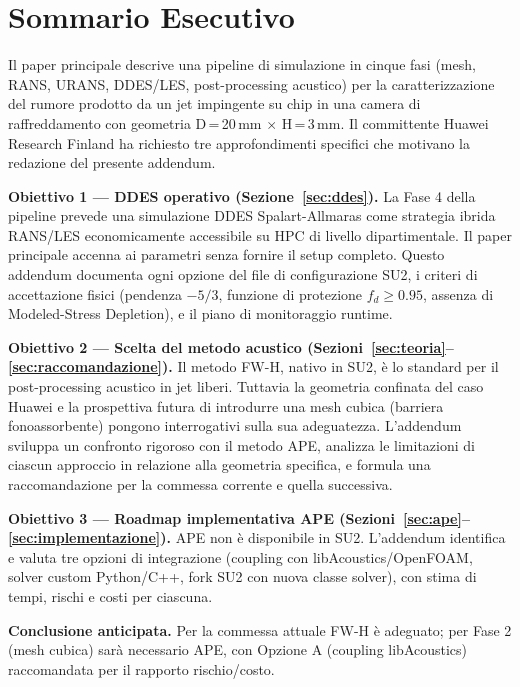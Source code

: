 \documentclass[11pt,a4paper]{article}
\begin{document}
\thispagestyle{fancy}
\section*{Sommario Esecutivo}

Il paper principale descrive una pipeline di simulazione in cinque fasi
(mesh, RANS, URANS, DDES/LES, post-processing acustico) per la caratterizzazione
del rumore prodotto da un jet impingente su chip in una camera di raffreddamento
con geometria D\,=\,20\,mm $\times$ H\,=\,3\,mm.
Il committente Huawei Research Finland ha richiesto tre approfondimenti specifici
che motivano la redazione del presente addendum.

\textbf{Obiettivo 1 — DDES operativo (Sezione~\ref{sec:ddes}).}
La Fase 4 della pipeline prevede una simulazione DDES Spalart-Allmaras come
strategia ibrida RANS/LES economicamente accessibile su HPC di livello dipartimentale.
Il paper principale accenna ai parametri senza fornire il setup completo.
Questo addendum documenta ogni opzione del file di configurazione SU2,
i criteri di accettazione fisici (pendenza $-5/3$, funzione di protezione
$f_d \geq 0.95$, assenza di Modeled-Stress Depletion), e il piano di monitoraggio
runtime.

\textbf{Obiettivo 2 — Scelta del metodo acustico (Sezioni~\ref{sec:teoria}--\ref{sec:raccomandazione}).}
Il metodo FW-H, nativo in SU2, è lo standard per il post-processing acustico
in jet liberi. Tuttavia la geometria confinata del caso Huawei e la prospettiva
futura di introdurre una mesh cubica (barriera fonoassorbente) pongono interrogativi
sulla sua adeguatezza. L'addendum sviluppa un confronto rigoroso con il metodo APE,
analizza le limitazioni di ciascun approccio in relazione alla geometria specifica,
e formula una raccomandazione per la commessa corrente e quella successiva.

\textbf{Obiettivo 3 — Roadmap implementativa APE (Sezioni~\ref{sec:ape}--\ref{sec:implementazione}).}
APE non è disponibile in SU2. L'addendum identifica e valuta tre opzioni di
integrazione (coupling con libAcoustics/OpenFOAM, solver custom Python/C++,
fork SU2 con nuova classe solver), con stima di tempi, rischi e costi per
ciascuna.

\medskip
\textbf{Conclusione anticipata.} Per la commessa attuale FW-H è adeguato;
per Fase 2 (mesh cubica) sarà necessario APE, con Opzione A
(coupling libAcoustics) raccomandata per il rapporto rischio/costo.
\end{document}
